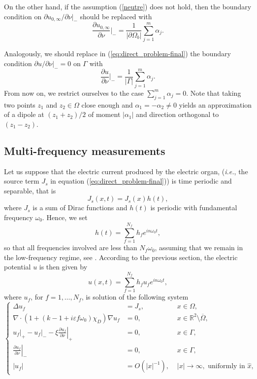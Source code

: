 On the other hand, if the assumption (\ref{neutre}) does not hold,
then the boundary condition on ${\partial
u_{0,\infty}}/{\partial\nu}\big|_{-}$ should be replaced with
$$
\frac{\partial u_{0,\infty}}{\partial\nu}\bigg|_{-} =
\frac{1}{|\partial \Omega_b|} \sum_{j=1}^m \alpha_j.
$$

Analogously, we should replace in (\ref{eq:direct_problem-final})
the boundary condition ${\partial u}/{\partial\nu}\big|_{-} =0$ on
$\Gamma$ with $$\frac{\partial u}{\partial\nu}\big|_{-} =
\frac{1}{|\Gamma|} \sum_{j=1}^m \alpha_j.$$ From now on, we
restrict ourselves to the case $\sum_{j=1}^m \alpha_j =0$. Note
that taking two points $z_1$ and $z_2 \in \Omega$ close enough and
$\alpha_1 = - \alpha_2 \neq 0$ yields an approximation of a dipole
at $(z_1+z_2)/2$ of moment $|\alpha_1|$ and direction orthogonal
to $(z_1-z_2)$.

\subsection{Multi-frequency measurements}

\label{sub:multifreq}

Let us suppose that the electric current produced by the electric
organ, (\emph{i.e.}, the source term $J_s$ in equation
(\ref{eq:direct_problem-final})) is time periodic and separable,
that is
\[
J_s(x,t)={J_s}(x)h(t),
\]
 where ${J_s}$ is a sum of Dirac functions and $h(t)$
is periodic with fundamental frequency $\omega_{0}$. Hence, we set
\begin{equation}
h(t)=\sum_{f=1}^{N_f} h_{f}e^{in\omega_{0}t},\label{eq:formule-h}
\end{equation}
so that all frequencies involved are less than $N_f \omega_0$,
assuming that we remain in the low-frequency regime, see
\cite{moller1995electric}. According to the previous section, the electric
potential $u$ is then given by
\begin{equation} \label{sumu}
u(x,t)=\sum_{f=1}^{N_f} h_{f}u_{f}e^{in\omega_{0}t},
\end{equation}
 where $u_{f}$, for $f=1,\ldots, N_f$,  is solution of the following system
\begin{equation}
\left\{ \begin{alignedat}{2} \Delta u_f & = {J_s}, & \,
\, x\in \Omega,\\
\nabla\cdot (1+ (k -1 +i\varepsilon f \omega_0) \chi_D) \nabla u_f
& = 0, & \,
\, x\in\mathbb{R}^{2}\setminus\overline{\Omega},\\
{} u_{f} \big|_+ - u_{f}  \big|_- - \xi\left.\frac{\partial u_{f}}{\partial\nu}\right|_{+} & =0, & \,\, x\in\Gamma,\\
\left.\frac{\partial u_{f}}{\partial\nu}\right|_{-} & =0, & \,\, x\in\Gamma,\\
\left|u_{f}\right| & = {O}(\left|x\right|^{-1}), &
\,\,\left|x\right|\rightarrow\infty,\text{ uniformly in }\hat{x},
\end{alignedat}
\right.\label{eq:complex_neumann_problem}
\end{equation}

